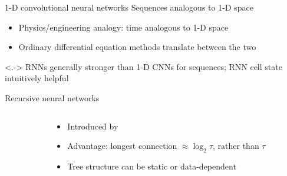 \begin{frame}{1-D convolutional neural networks}
    Sequences analogous to 1-D space
    \begin{itemize}
        \item<+-> Physics/engineering analogy: time analogous to 1-D space
        \item Ordinary differential equation methods translate between the two
    \end{itemize}

    \begin{center}
        

    \end{center}

    \uncover<.->{
        RNNs generally stronger than 1-D CNNs for sequences;
        RNN cell state intuitively helpful
    }
\end{frame}

\begin{frame}{Recursive neural networks}
    \begin{columns}
        \begin{column}{0.61\textwidth}
            
        \end{column}
        \begin{column}{0.39\textwidth}
            \begin{itemize}
                \item Introduced by \citet{PollackAI90}
                \item Advantage: longest connection $\approx \log_2 \tau$, rather than $\tau$
                \item Tree structure can be static or data-dependent
            \end{itemize}
        \end{column}
    \end{columns}
\end{frame}

